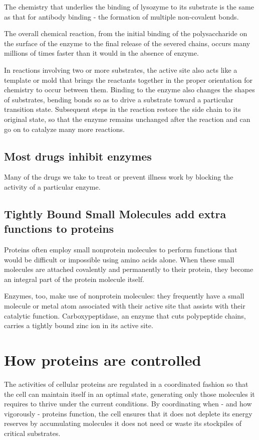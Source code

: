 The chemistry that underlies the binding of lysozyme to its substrate is
the same as that for antibody binding - the formation of multiple non-covalent bonds.

The overall chemical reaction, from the initial binding of the polysaccharide
on the surface of the enzyme to the final release of the severed
chains, occurs many millions of times faster than it would in the absence
of enzyme.

In reactions involving two or more
substrates, the active site also acts like a template or mold that brings
the reactants together in the proper orientation for chemistry to occur between them.
Binding to the enzyme also changes the shapes of substrates,
bending bonds so as to drive a substrate toward a particular
transition state. Subsequent
steps in the reaction restore the side chain to its original state, so that the
enzyme remains unchanged after the reaction and can go on to catalyze
many more reactions.

\subsection{Most drugs inhibit enzymes}

Many of the drugs we take to treat or prevent illness work by blocking
the activity of a particular enzyme.


\subsection{Tightly Bound Small Molecules add extra functions to proteins}

Proteins often employ small nonprotein molecules to perform functions that would be
difficult or impossible using amino acids alone. When these small molecules are attached covalently and permanently
to their protein, they become an integral part of the protein molecule
itself.

Enzymes, too, make use of nonprotein molecules: they frequently have
a small molecule or metal atom associated with their active site that
assists with their catalytic function. Carboxypeptidase, an enzyme that
cuts polypeptide chains, carries a tightly bound zinc ion in its active site.

\section{How proteins are controlled}

The activities of cellular proteins are regulated in
a coordinated fashion so that the cell can maintain itself in an optimal
state, generating only those molecules it requires to thrive under the current conditions.
By coordinating when - and how vigorously - proteins
function, the cell ensures that it does not deplete its energy reserves by
accumulating molecules it does not need or waste its stockpiles of critical substrates.

